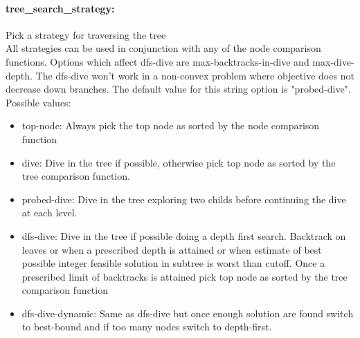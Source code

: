 \paragraph{tree\_search\_strategy:}\label{sec:tree_search_strategy} Pick a strategy for traversing the tree $\;$ \\
 All strategies can be used in conjunction with
any of the node comparison functions. Options
which affect dfs-dive are max-backtracks-in-dive
and max-dive-depth. The dfs-dive won't work in a
non-convex problem where objective does not
decrease down branches.
The default value for this string option is "probed-dive".
\\ 
Possible values:
\begin{itemize}
   \item top-node:  Always pick the top node as sorted by the node
comparison function
   \item dive: Dive in the tree if possible, otherwise pick
top node as sorted by the tree comparison
function.
   \item probed-dive: Dive in the tree exploring two childs before
continuing the dive at each level.
   \item dfs-dive: Dive in the tree if possible doing a depth
first search. Backtrack on leaves or when a
prescribed depth is attained or when estimate
of best possible integer feasible solution in
subtree is worst than cutoff. Once a prescribed
limit of backtracks is attained pick top node
as sorted by the tree comparison function
   \item dfs-dive-dynamic: Same as dfs-dive but once enough solution are
found switch to best-bound and if too many
nodes switch to depth-first.
\end{itemize}


